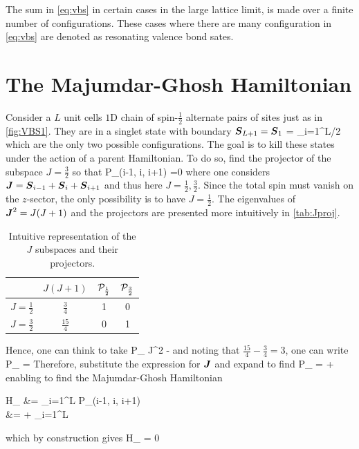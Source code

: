 		The sum in \eqref{eq:vbs} in certain cases in the large lattice limit, is made over a finite number of configurations. These cases where there are many configuration in \eqref{eq:vbs} are denoted as resonating valence bond sates.

	\section{The Majumdar-Ghosh Hamiltonian}

		Consider a $L$ unit cells $1$D chain of spin-$\frac{1}{2}$ alternate pairs of sites just as in \autoref{fig:VBS1}. They are in a singlet state with boundary $\vb* S_{L+1} = \vb* S_{1}$
		\be {} = \bigotimes_{i=1}^{L/2}   \label{eq:mgdpm} \ee
		which are the only two possible configurations. The goal is to kill these states under the action of a parent Hamiltonian. To do so, find the projector of the subspace $J=\frac{3}{2}$ so that
		\be \mc P_(i-1, i, i+1)  =0 \ee
		where one considers $\vb* J = \vb* S_{i-1} + \vb* S_i + \vb* S_{i+1}$ and thus here $J=\frac{1}{2}, \frac{3}{2}$. Since the total spin must vanish on the $z$-sector, the only possibility is to have $J=\frac{1}{2}$. The eigenvalues of $\vb* J^2=J(J+1)$ and the projectors are presented more intuitively in \autoref{tab:Jproj}.
		\begin{table}[h!]
			\centering
			\begin{tabular}{cccc}
				& $J(J+1)$ & $\mathcal P_\frac{1}{2}$ & $\mathcal P_\frac{3}{2}$ \\ \hline
				$J=\frac{1}{2}$ & $\frac{3}{4}$ & 1 & 0 \\
				$J=\frac{3}{2}$ & $\frac{15}{4}$ & 0 & 1
			\end{tabular}
			\caption{Intuitive representation of the $J$ subspaces and their projectors.}
			\label{tab:Jproj}
		\end{table}
		Hence, one can think to take
		\be \mc P_ \propto \vb* J^2 -  \ee
		and noting that $\frac{15}{4}-\frac{3}{4} = 3$, one can write
		\be \mc P_ =   \ee
		Therefore, substitute the expression for $\vb* J$ and expand to find
		\be \mc P_ =  +   \ee
		enabling to find the Majumdar-Ghosh Hamiltonian
		\be \begin{split} \mc H_ &= \sum_{i=1}^L \mc P_(i-1, i, i+1) \\ &=  +  \sum_{i=1}^L  \end{split} \ee
		which by construction gives
		\be \mc H_  = 0 \ee

